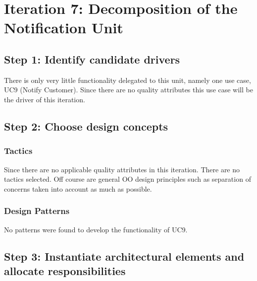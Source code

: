 \section{Iteration 7: Decomposition of the Notification Unit}
\label{add:it7}

\subsection{Step 1: Identify candidate drivers}
\label{add:it7/drivers}

\npar There is only very little functionality delegated to this unit, namely one
use case, UC9 (Notify Customer). Since there are no quality attributes this use
case will be the driver of this iteration.

\subsection{Step 2: Choose design concepts}
\label{add:it7/concepts}

\subsubsection{Tactics}
\label{add:it7/tactics}

\npar Since there are no applicable quality attributes in this iteration. There
are no tactics selected. Off course are general OO design principles such as
separation of concerns taken into account as much as possible.

\subsubsection{Design Patterns}
\label{add:it7/patterns}

\npar No patterns were found to develop the functionality of UC9.

\subsection{Step 3: Instantiate architectural elements and allocate responsibilities}
\label{add:it7/elements}

